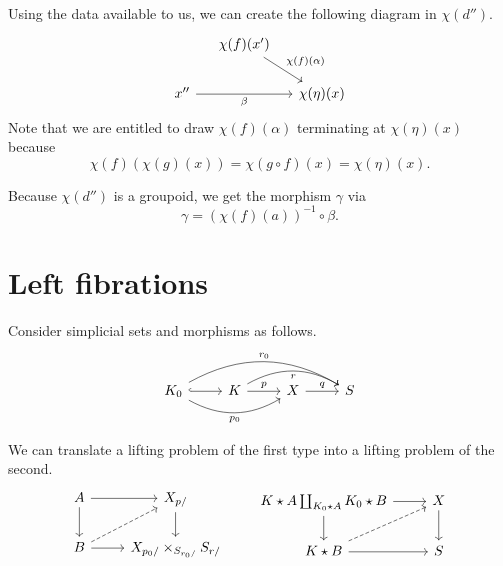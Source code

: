 \documentclass[main.tex]{subfiles}
\begin{document}
\begin{example}
\begin{itemize}
      Using the data available to us, we can create the following diagram in $\chi(d'')$.
      \begin{equation*}
        \begin{tikzcd}[column sep=small]
          & \chi(f)(x')
          \arrow[dr, "\chi(f)(\alpha)"]
          \\
          x''
          \arrow[rr, swap, "\beta"]
          && \chi(\eta)(x)
        \end{tikzcd}
      \end{equation*}
      Note that we are entitled to draw $\chi(f)(\alpha)$ terminating at $\chi(\eta)(x)$ because
      \begin{equation*}
        \chi(f)(\chi(g)(x)) = \chi(g \circ f)(x) = \chi(\eta)(x).
      \end{equation*}

      Because $\chi(d'')$ is a groupoid, we get the morphism $\gamma$ via
      \begin{equation*}
        \gamma = (\chi(f)(a))^{-1} \circ \beta.
      \end{equation*}
  \end{itemize}

\end{example}

\section{Left fibrations}
\label{sec:left_fibrations}

\begin{lemma}
  \label{lemma:equivalent_lifting_problems_starred_smash}
  Consider simplicial sets and morphisms as follows.
  \begin{equation*}
    \begin{tikzcd}
      K_{0}
      \arrow[r, hook]
      \arrow[rr, bend right, swap, "p_{0}"]
      \arrow[rrr, bend left, "r_{0}"]
      & K
      \arrow[r, "p"]
      \arrow[rr, bend left, swap, "r"]
      & X
      \arrow[r, "q"]
      & S
    \end{tikzcd}
  \end{equation*}

  We can translate a lifting problem of the first type into a lifting problem of the second.
  \begin{equation*}
    \begin{tikzcd}
      A
      \arrow[r]
      \arrow[d]
      & X_{p/}
      \arrow[d]
      \\
      B
      \arrow[r]
      \arrow[ur, dashed]
      & X_{p_{0}/} \times_{S_{r_{0}/}} S_{r/}
    \end{tikzcd}
    \qquad
    \begin{tikzcd}
      K \star A \coprod_{K_{0} \star A} K_{0} \star B
      \arrow[r]
      \arrow[d]
      & X
      \arrow[d]
      \\
      K \star B
      \arrow[r]
      \arrow[ur, dashed]
      & S
    \end{tikzcd}
  \end{equation*}
\end{lemma}
\end{document}
